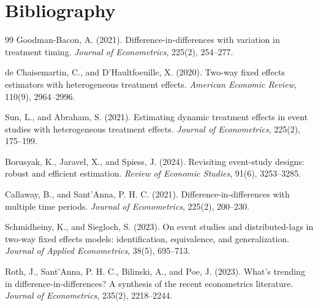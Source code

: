 \documentclass[11pt]{article}
\theoremstyle{definition}
\theoremstyle{plain}
\theoremstyle{remark}
\begin{document}
\section*{Bibliography}
\begin{thebibliography}{99}
Goodman-Bacon, A. (2021). Difference-in-differences with variation in treatment timing. \emph{Journal of Econometrics}, 225(2), 254--277.

de Chaisemartin, C., and D'Haultfoeuille, X. (2020). Two-way fixed effects estimators with heterogeneous treatment effects. \emph{American Economic Review}, 110(9), 2964--2996.

Sun, L., and Abraham, S. (2021). Estimating dynamic treatment effects in event studies with heterogeneous treatment effects. \emph{Journal of Econometrics}, 225(2), 175--199.

Borusyak, K., Jaravel, X., and Spiess, J. (2024). Revisiting event-study designs: robust and efficient estimation. \emph{Review of Economic Studies}, 91(6), 3253--3285.

Callaway, B., and Sant'Anna, P. H. C. (2021). Difference-in-differences with multiple time periods. \emph{Journal of Econometrics}, 225(2), 200--230.

Schmidheiny, K., and Siegloch, S. (2023). On event studies and distributed-lags in two-way fixed effects models: identification, equivalence, and generalization. \emph{Journal of Applied Econometrics}, 38(5), 695--713.

Roth, J., Sant'Anna, P. H. C., Bilinski, A., and Poe, J. (2023). What's trending in difference-in-differences? A synthesis of the recent econometrics literature. \emph{Journal of Econometrics}, 235(2), 2218--2244.
\end{thebibliography}
\end{document}
